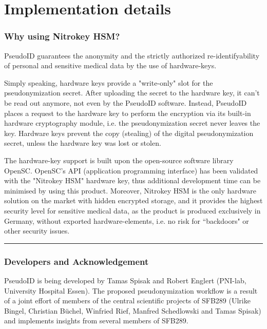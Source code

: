 
\section{Implementation details}
\subsubsection{Why using Nitrokey HSM?}
PseudoID guarantees the anonymity and the strictly authorized re-identifyability of personal and sensitive medical data by the use of hardware-keys.

Simply speaking, hardware keys provide a "write-only" slot for the pseudonymization secret. After uploading the secret to the hardware key, it can't be read out anymore, not even by the PseudoID software. Instead, PseudoID places a request to the hardware key to perform the encryption via its built-in hardware cryptography module, i.e. the pseudonymization secret never leaves the key. Hardware keys prevent the copy (stealing) of the digital pseudonymization secret, unless the hardware key was lost or stolen.

The hardware-key support is built upon the open-source software library OpenSC. OpenSC's API (application programming interface) has been validated with the "Nitrokey HSM" hardware key, thus additional development time can be minimised by using this product. Moreover, Nitrokey HSM is the only hardware solution on the market with hidden encrypted storage, and it provides the highest security level for sensitive medical data, as the product is produced exclusively in Germany, without exported hardware-elements, i.e. no risk for “backdoors" or other security issues.

\par\noindent\rule{\textwidth\color{pniblue}}{0.4pt}
\subsubsection{Developers and Acknowledgement}
PseudoID is being developed by Tamas Spisak and Robert Englert (PNI-lab, University Hospital Essen). The proposed pseudonymization workflow is a result of a joint effort of members of the central scientific projects of SFB289 (Ulrike Bingel, Christian Büchel, Winfried Rief, Manfred Schedlowski and Tamas Spisak) and implements insights from several members of SFB289.